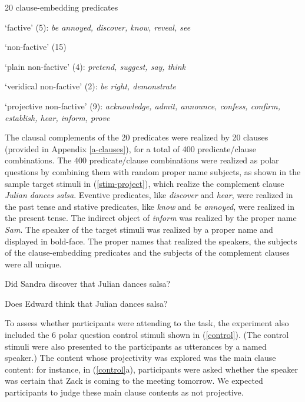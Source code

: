 \documentclass[11pt,fleqn]{article}
\newcommand{\6}{\mbox{$[\hspace*{-.6mm}[$}}
\newcommand{\9}{\mbox{$]\hspace*{-.6mm}]$}}
\begin{document}
\begin{exe}
\ex\label{pred} 20 clause-embedding predicates 

\begin{xlist}

\ex `factive' (5): {\em be annoyed, discover, know, reveal, see}

\ex `non-factive' (15)

\begin{xlist}

\ex `plain non-factive' (4): {\em pretend, suggest, say, think}

\ex `veridical non-factive' (2): {\em be right, demonstrate}

\ex `projective non-factive' (9): {\em acknowledge, admit, announce, confess, confirm, establish, hear, inform, prove}


\end{xlist}

\end{xlist}

\end{exe}

The clausal complements of the 20 predicates were realized by 20 clauses (provided in Appendix \ref{a-clauses}), for a total of 400 predicate/clause combinations. The 400 predicate/clause combinations were realized as polar questions by combining them with random proper name subjects, as shown in the sample target stimuli in (\ref{stim-project}), which realize the complement clause {\em Julian dances salsa}. Eventive predicates, like {\em discover} and {\em hear}, were realized in the past tense and stative predicates, like {\em know} and {\em be annoyed}, were realized in the present tense. The indirect object of {\em inform} was realized by the proper name {\em Sam}.  The speaker of the target stimuli was realized by a proper name and displayed in bold-face. The proper names that realized the speakers, the subjects of the clause-embedding predicates and the subjects of the complement clauses were all unique.

\begin{exe}
\ex\label{stim-project} 
\begin{xlist}
 Did Sandra discover that Julian dances salsa?

 Does Edward think that Julian dances salsa?
\end{xlist}
\end{exe}

To assess whether participants were attending to the task, the experiment also included the 6  polar question control stimuli shown in (\ref{control}). (The control stimuli were also presented to the participants as utterances by a named speaker.) The content whose projectivity was explored was the main clause content: for instance, in (\ref{control}a), participants were asked whether the speaker was certain that Zack is coming to the meeting tomorrow. We expected participants to judge these main clause contents as not projective.
\end{document}
